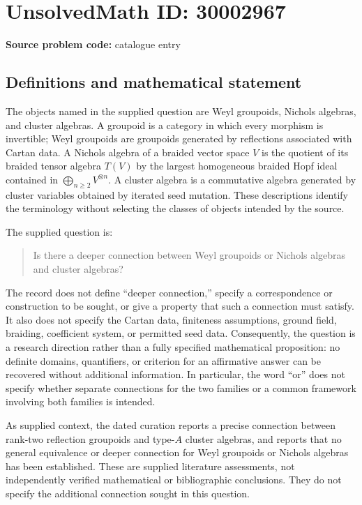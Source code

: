 \documentclass[11pt]{article}
\begin{document}
\section*{UnsolvedMath ID: 30002967}
\textbf{Source problem code:} catalogue entry
\subsection{Definitions and mathematical statement}
The objects named in the supplied question are Weyl groupoids, Nichols algebras, and cluster algebras. A groupoid is a category in which every morphism is invertible; Weyl groupoids are groupoids generated by reflections associated with Cartan data. A Nichols algebra of a braided vector space \(V\) is the quotient of its braided tensor algebra \(T(V)\) by the largest homogeneous braided Hopf ideal contained in \(\bigoplus_{n\geq 2}V^{\otimes n}\). A cluster algebra is a commutative algebra generated by cluster variables obtained by iterated seed mutation. These descriptions identify the terminology without selecting the classes of objects intended by the source.

The supplied question is:
\begin{quote}
Is there a deeper connection between Weyl groupoids or Nichols algebras and cluster algebras?
\end{quote}

The record does not define ``deeper connection,'' specify a correspondence or construction to be sought, or give a property that such a connection must satisfy. It also does not specify the Cartan data, finiteness assumptions, ground field, braiding, coefficient system, or permitted seed data. Consequently, the question is a research direction rather than a fully specified mathematical proposition: no definite domains, quantifiers, or criterion for an affirmative answer can be recovered without additional information. In particular, the word ``or'' does not specify whether separate connections for the two families or a common framework involving both families is intended.

As supplied context, the dated curation reports a precise connection between rank-two reflection groupoids and type-\(A\) cluster algebras, and reports that no general equivalence or deeper connection for Weyl groupoids or Nichols algebras has been established. These are supplied literature assessments, not independently verified mathematical or bibliographic conclusions. They do not specify the additional connection sought in this question.
\end{document}
